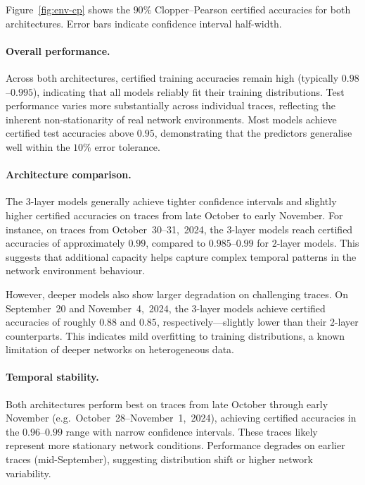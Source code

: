 \documentclass[thesis]{uofithesis} %
\begin{document}
    Figure~\ref{fig:env-cp} shows the $90\%$ Clopper--Pearson certified
    accuracies for both architectures.  Error bars indicate confidence
    interval half-width.

    \paragraph{Overall performance.}
    Across both architectures, certified training accuracies remain high
    (typically $0.98$--$0.995$), indicating that all models reliably fit
    their training distributions.  Test performance varies more
    substantially across individual traces, reflecting the inherent
    non-stationarity of real network environments.  Most models achieve
    certified test accuracies above $0.95$, demonstrating that the
    predictors generalise well within the $10\%$ error tolerance.

    \paragraph{Architecture comparison.}
    The $3$-layer models generally achieve tighter confidence intervals and
    slightly higher certified accuracies on traces from late October to
    early November.  For instance, on traces from October~30--31,~2024, the
    $3$-layer models reach certified accuracies of approximately $0.99$,
    compared to $0.985$--$0.99$ for $2$-layer models.  This suggests that
    additional capacity helps capture complex temporal patterns in the network
    environment behaviour.

    However, deeper models also show larger degradation on challenging
    traces.  On September~20 and November~4,~2024, the $3$-layer models
    achieve certified accuracies of roughly $0.88$ and $0.85$,
    respectively---slightly lower than their $2$-layer counterparts.  This
    indicates mild overfitting to training distributions, a known
    limitation of deeper networks on heterogeneous data.

    \paragraph{Temporal stability.}
    Both architectures perform best on traces from late October through
    early November (e.g.\ October~28--November~1,~2024), achieving
    certified accuracies in the $0.96$--$0.99$ range with narrow confidence
    intervals.  These traces likely represent more stationary network
    conditions.  Performance degrades on earlier traces (mid-September),
    suggesting distribution shift or higher network variability.
\end{document}
